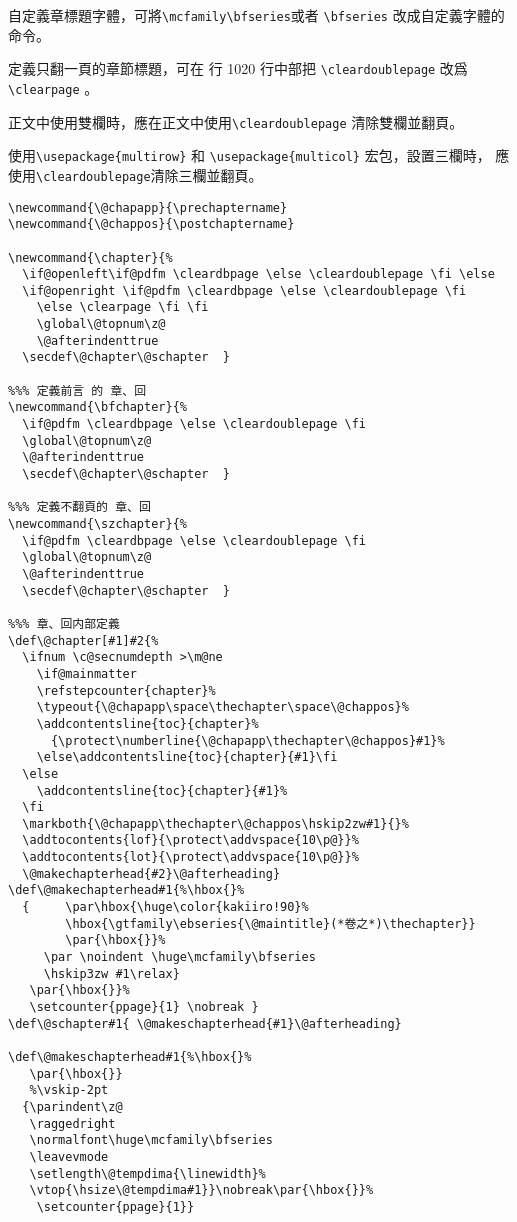 \par%
自定義章標題字體，可將\verb+\mcfamily\bfseries+或者 \verb+\bfseries+
改成自定義字體的命令。
\par%
定義只翻一頁的章節標題，可在 行 1020 行中部把 \verb+\cleardoublepage+ 改爲 \verb+\clearpage+ 。
\par%
正文中使用雙欄時，應在正文中使用\verb+\cleardoublepage+ 清除雙欄並翻頁。
\par%
使用\verb+\usepackage{multirow}+ 和 \verb+\usepackage{multicol}+ 宏包，設置三欄時，
應使用\verb+\cleardoublepage+清除三欄並翻頁。
\begin{lstlisting}[firstnumber=999]
%%% 定義的 章、回
\newcommand{\@chapapp}{\prechaptername}
\newcommand{\@chappos}{\postchaptername}

\newcommand{\chapter}{%
  \if@openleft\if@pdfm \cleardbpage \else \cleardoublepage \fi \else
  \if@openright \if@pdfm \cleardbpage \else \cleardoublepage \fi
    \else \clearpage \fi \fi
    \global\@topnum\z@
    \@afterindenttrue
  \secdef\@chapter\@schapter  }

%%% 定義前言 的 章、回
\newcommand{\bfchapter}{%
  \if@pdfm \cleardbpage \else \cleardoublepage \fi
  \global\@topnum\z@
  \@afterindenttrue
  \secdef\@chapter\@schapter  }

%%% 定義不翻頁的 章、回
\newcommand{\szchapter}{%
  \if@pdfm \cleardbpage \else \cleardoublepage \fi
  \global\@topnum\z@
  \@afterindenttrue
  \secdef\@chapter\@schapter  }

%%% 章、回内部定義
\def\@chapter[#1]#2{%
  \ifnum \c@secnumdepth >\m@ne
    \if@mainmatter
    \refstepcounter{chapter}%
    \typeout{\@chapapp\space\thechapter\space\@chappos}%
    \addcontentsline{toc}{chapter}%
      {\protect\numberline{\@chapapp\thechapter\@chappos}#1}%
    \else\addcontentsline{toc}{chapter}{#1}\fi
  \else
    \addcontentsline{toc}{chapter}{#1}%
  \fi
  \markboth{\@chapapp\thechapter\@chappos\hskip2zw#1}{}%
  \addtocontents{lof}{\protect\addvspace{10\p@}}%
  \addtocontents{lot}{\protect\addvspace{10\p@}}%
  \@makechapterhead{#2}\@afterheading}
\def\@makechapterhead#1{%\hbox{}%
  {     \par\hbox{\huge\color{kakiiro!90}%
        \hbox{\gtfamily\ebseries{\@maintitle}(*卷之*)\thechapter}}
        \par{\hbox{}}%
     \par \noindent \huge\mcfamily\bfseries
     \hskip3zw #1\relax}
   \par{\hbox{}}%
   \setcounter{ppage}{1} \nobreak }
\def\@schapter#1{ \@makeschapterhead{#1}\@afterheading}

\def\@makeschapterhead#1{%\hbox{}%
   \par{\hbox{}}
   %\vskip-2pt
  {\parindent\z@
   \raggedright
   \normalfont\huge\mcfamily\bfseries
   \leavevmode
   \setlength\@tempdima{\linewidth}%
   \vtop{\hsize\@tempdima#1}}\nobreak\par{\hbox{}}%
    \setcounter{ppage}{1}}
\end{lstlisting}

